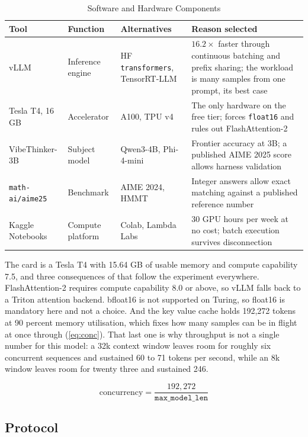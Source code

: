 \documentclass[conference]{IEEEtran}
\begin{document}
\begin{table}[t]
\caption{Software and Hardware Components}
\label{tab:tools}
\centering
\footnotesize
\begin{tabular}{@{}L{2.4cm}L{3.4cm}L{3.4cm}L{6.4cm}@{}}
\toprule
\textbf{Tool} & \textbf{Function} & \textbf{Alternatives} & \textbf{Reason selected} \\
\midrule
vLLM & Inference engine & HF \texttt{transformers}, TensorRT-LLM &
$16.2\times$ faster through continuous batching and prefix sharing; the workload
is many samples from one prompt, its best case \\
\addlinespace
Tesla T4, 16\,GB & Accelerator & A100, TPU v4 & The only hardware on the free
tier; forces \texttt{float16} and rules out FlashAttention-2 \\
\addlinespace
VibeThinker-3B & Subject model & Qwen3-4B, Phi-4-mini & Frontier accuracy at 3B; a
published AIME 2025 score allows harness validation \\
\addlinespace
\texttt{math-ai/aime25} & Benchmark & AIME 2024, HMMT & Integer answers allow
exact matching against a published reference number \\
\addlinespace
Kaggle Notebooks & Compute platform & Colab, Lambda Labs & 30 GPU hours per week
at no cost; batch execution survives disconnection \\
\bottomrule
\end{tabular}
\end{table}

The card is a Tesla T4 with 15.64 GB of usable memory and compute capability 7.5,
and three consequences of that follow the experiment everywhere. FlashAttention-2
requires compute capability 8.0 or above, so vLLM falls back to a Triton attention
backend. bfloat16 is not supported on Turing, so float16 is mandatory here and
not a choice. And the key value cache holds 192,272 tokens at 90 percent memory
utilisation, which fixes how many samples can be in flight at once through
(\ref{eq:conc}). That last one is why throughput is not a single number for this
model: a 32k context window leaves room for roughly six concurrent sequences and
sustained 60 to 71 tokens per second, while an 8k window leaves room for
twenty three and sustained 246.

\begin{equation}
\text{concurrency} = \frac{192{,}272}{\texttt{max\_model\_len}}
\label{eq:conc}
\end{equation}

\subsection{Protocol}
\end{document}
